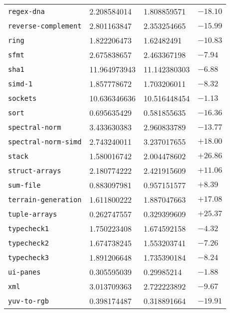 \begin{longtable}{llll}
\texttt{regex-dna}                & 2.208584014       & 1.808859571         & $-18.10$    \\
\texttt{reverse-complement}       & 2.801163847       & 2.353254665         & $-15.99$    \\
\texttt{ring}                     & 1.822206473       & 1.62482491          & $-10.83$    \\
\texttt{sfmt}                     & 2.675838657       & 2.463367198         & $-7.94$     \\
\texttt{sha1}                     & 11.964973943      & 11.142380303        & $-6.88$     \\
\texttt{simd-1}                   & 1.857778672       & 1.703206011         & $-8.32$     \\
\texttt{sockets}                  & 10.636346636      & 10.516448454        & $-1.13$     \\
\texttt{sort}                     & 0.695635429       & 0.581855635         & $-16.36$    \\
\texttt{spectral-norm}            & 3.433630383       & 2.960833789         & $-13.77$    \\
\texttt{spectral-norm-simd}       & 2.743240011       & 3.237017655         & $+18.00$    \\
\texttt{stack}                    & 1.580016742       & 2.004478602         & $+26.86$    \\
\texttt{struct-arrays}            & 2.180774222       & 2.421915609         & $+11.06$    \\
\texttt{sum-file}                 & 0.883097981       & 0.957151577         & $+8.39$     \\
\texttt{terrain-generation}       & 1.611800222       & 1.887047663         & $+17.08$    \\
\texttt{tuple-arrays}             & 0.262747557       & 0.329399609         & $+25.37$    \\
\texttt{typecheck1}               & 1.750223408       & 1.674592158         & $-4.32$     \\
\texttt{typecheck2}               & 1.674738245       & 1.553203741         & $-7.26$     \\
\texttt{typecheck3}               & 1.891206648       & 1.735390184         & $-8.24$     \\
\texttt{ui-panes}                 & 0.305595039       & 0.29985214          & $-1.88$     \\
\texttt{xml}                      & 3.013709363       & 2.722223892         & $-9.67$     \\
\texttt{yuv-to-rgb}               & 0.398174487       & 0.318891664         & $-19.91$    \\
\end{longtable}

